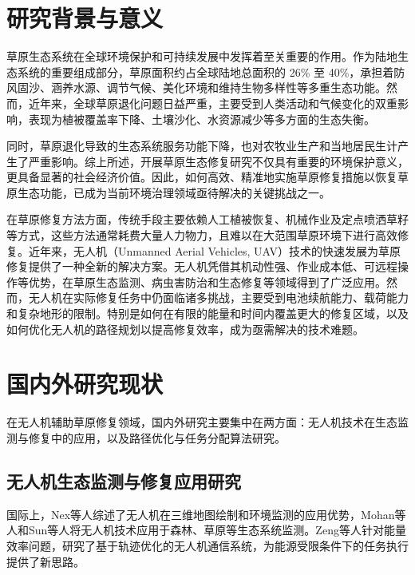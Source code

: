 \documentclass[AutoFakeBold]{LZUThesis}
\begin{document}
\section{研究背景与意义}

草原生态系统在全球环境保护和可持续发展中发挥着至关重要的作用。作为陆地生态系统的重要组成部分，草原面积约占全球陆地总面积的 26\% 至 40\%\cite{chapin2013global}，承担着防风固沙、涵养水源、调节气候、美化环境和维持生物多样性等多重生态功能\cite{gibson2009grasses}。然而，近年来，全球草原退化问题日益严重，主要受到人类活动和气候变化的双重影响，表现为植被覆盖率下降、土壤沙化、水资源减少等多方面的生态失衡\cite{bai2020long}。

同时，草原退化导致的生态系统服务功能下降，也对农牧业生产和当地居民生计产生了严重影响。综上所述，开展草原生态修复研究不仅具有重要的环境保护意义，更具备显著的社会经济价值。因此，如何高效、精准地实施草原修复措施以恢复草原生态功能，已成为当前环境治理领域亟待解决的关键挑战之一\cite{freitag2021restoration}。

在草原修复方法方面，传统手段主要依赖人工植被恢复、机械作业及定点喷洒草籽等方式，这些方法通常耗费大量人力物力，且难以在大范围草原环境下进行高效修复。近年来，无人机（Unmanned Aerial Vehicles, UAV）技术的快速发展为草原修复提供了一种全新的解决方案。无人机凭借其机动性强、作业成本低、可远程操作等优势，在草原生态监测、病虫害防治和生态修复等领域得到了广泛应用\cite{steffen2015planetary}。然而，无人机在实际修复任务中仍面临诸多挑战，主要受到电池续航能力、载荷能力和复杂地形的限制。特别是如何在有限的能量和时间内覆盖更大的修复区域，以及如何优化无人机的路径规划以提高修复效率，成为亟需解决的技术难题。

\section{国内外研究现状}
在无人机辅助草原修复领域，国内外研究主要集中在两方面：无人机技术在生态监测与修复中的应用，以及路径优化与任务分配算法研究。

\subsection{无人机生态监测与修复应用研究}

国际上，Nex等人\cite{nex2014uav}综述了无人机在三维地图绘制和环境监测的应用优势，Mohan等人\cite{mohan2021uav}和Sun等人\cite{sun2018unmanned}将无人机技术应用于森林、草原等生态系统监测。Zeng等人\cite{zeng2017energy}针对能量效率问题，研究了基于轨迹优化的无人机通信系统，为能源受限条件下的任务执行提供了新思路。
\end{document}
